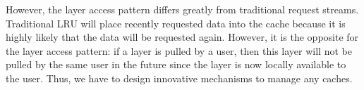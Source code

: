 However, the layer access pattern differs greatly from traditional request streams.
Traditional LRU will place recently requested data into the cache 
because it is highly likely that the data will be requested again.
However, it is the opposite for the layer access pattern: if a layer is pulled by a user,
then this layer will not be pulled by the same user in the future
since the layer is now locally available to the user. Thus, we have to design innovative mechanisms to manage any caches.






